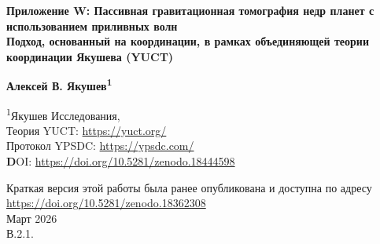 \documentclass[12pt,a4paper]{article}
\theoremstyle{remark}
\begin{document}
	
	\begin{titlepage}
		\begin{center}
			\vspace*{1cm}
			
			\Huge\textbf{Приложение W: Пассивная гравитационная томография недр планет с использованием приливных волн} \\
			\vspace{0.5cm}
			\Large\textbf{Подход, основанный на координации, в рамках объединяющей теории координации Якушева (YUCT)}
			
			\vspace{1.5cm}
			
			\Large\textbf{Алексей В. Якушев\textsuperscript{1}}
			
			\vspace{0.3cm}
			\large
			\textsuperscript{1}Якушев Исследования, \\
			Теория YUCT: \url{https://yuct.org/}\\
			Протокол YPSDC: \url{https://ypsdc.com/}\\
			
			\vspace{2cm}
			\textbf DOI: \url{https://doi.org/10.5281/zenodo.18444598}\\
			
			\vspace{1cm}
			
			\vspace{0cm}
			\large 
			Краткая версия этой работы была ранее опубликована и доступна по адресу\\ \url{https://doi.org/10.5281/zenodo.18362308}\\
			\vspace{1cm}
			Март 2026 \\ \large В.2.1.
			
			\vspace{2cm}
			

\end{center}
\end{titlepage}
\end{document}
